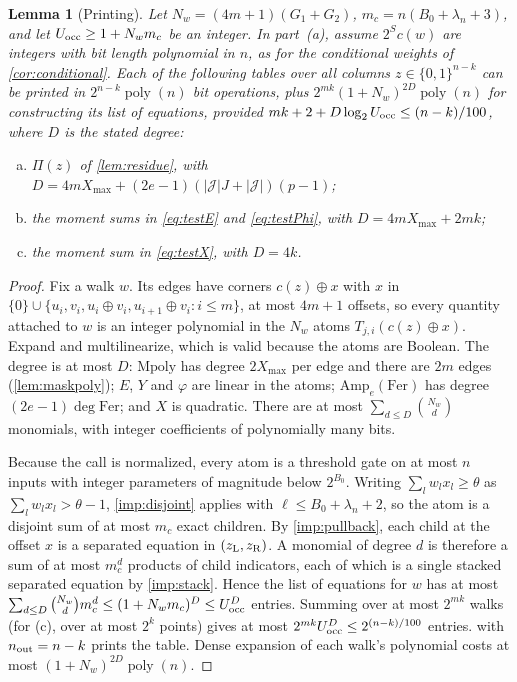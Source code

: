 \documentclass[11pt,letterpaper]{article}
\newtheorem{lemma}[theorem]{Lemma}
\theoremstyle{definition}
\theoremstyle{remark}
\newcommand{\Amp}{\mathrm{Amp}}
\newcommand{\poly}{\operatorname{poly}}
\newcommand{\Mpoly}{\mathrm{Mpoly}}
\newcommand{\Fer}{\mathrm{Fer}}
\newcommand{\cJ}{\mathcal J}
\newcommand{\lgx}{\log_2}
\newcommand{\Xmax}{X_{\max}}
\begin{document}
\begin{lemma}[Printing]\label{lem:print}
Let \(N_w=(4m+1)(G_1+G_2)\), \(m_c=n(B_0+\lambda_n+3)\), and let
\(U_{\rm occ}\ge1+N_wm_c\) be an integer. In part~(a), assume
\(2^S c(w)\) are integers with bit length polynomial in \(n\), as for
the conditional weights of \cref{cor:conditional}. Each of the following tables
over all columns \(z\in\{0,1\}^{n-k}\) can be printed in
\(2^{n-k}\poly(n)\) bit operations, plus
\(2^{mk}(1+N_w)^{2D}\poly(n)\) for constructing its list of equations,
provided \(mk+2+D\lgx U_{\rm occ}\le(n-k)/100\), where \(D\) is the
stated degree:
\begin{enumerate}[(a)]
\item \(\Pi(z)\) of \cref{lem:residue}, with \(D=4m\Xmax+(2e-1)(|\cJ|J+|\cJ|)(p-1)\);
\item the moment sums in \eqref{eq:testE} and \eqref{eq:testPhi}, with \(D=4m\Xmax+2mk\);
\item the moment sum in \eqref{eq:testX}, with \(D=4k\).
\end{enumerate}
\end{lemma}
\begin{proof}
Fix a walk \(w\). Its edges have corners \(c(z)\oplus x\) with \(x\) in
\(\{0\}\cup\{u_i,v_i,u_i\oplus v_i,u_{i+1}\oplus v_i:i\le m\}\), at most
\(4m+1\) offsets, so every quantity attached to \(w\) is an integer
polynomial in the \(N_w\) atoms \(T_{j,i}(c(z)\oplus x)\). Expand and
multilinearize, which is valid because the atoms are Boolean. The
degree is at most \(D\): \(\Mpoly\) has degree \(2\Xmax\) per edge and
there are \(2m\) edges (\cref{lem:maskpoly}); \(E\), \(Y\) and \(\varphi\)
are linear in the atoms; \(\Amp_e(\Fer)\) has degree
\((2e-1)\deg\Fer\); and \(X\) is quadratic. There are at most
\(\sum_{d\le D}\binom{N_w}{d}\) monomials, with integer coefficients of
polynomially many bits.

Because the call is normalized, every atom is a threshold gate on at
most \(n\) inputs with integer parameters of magnitude below
\(2^{B_0}\). Writing \(\sum_lw_lx_l\ge\theta\) as
\(\sum_lw_lx_l>\theta-1\), \cref{imp:disjoint} applies with
\(\ell\le B_0+\lambda_n+2\), so the atom is a disjoint sum of at most
\(m_c\) exact children. By \cref{imp:pullback}, each child at the
offset \(x\) is a separated equation in \((z_{\rm L},z_{\rm R})\). A
monomial of degree \(d\) is therefore a sum of at most \(m_c^d\)
products of child indicators, each of which is a single stacked
separated equation by \cref{imp:stack}. Hence the list of equations
for \(w\) has at most
\(\sum_{d\le D}\binom{N_w}dm_c^d\le(1+N_wm_c)^D\le U_{\rm occ}^D\)
entries. Summing over at most \(2^{mk}\) walks (for (c), over at most
\(2^k\) points) gives at most \(2^{mk}U_{\rm occ}^D\le2^{(n-k)/100}\)
entries.  with \(n_{\rm out}=n-k\) prints the table.
Dense expansion of each walk's polynomial costs at most
\((1+N_w)^{2D}\poly(n)\).
\end{proof}
\end{document}
